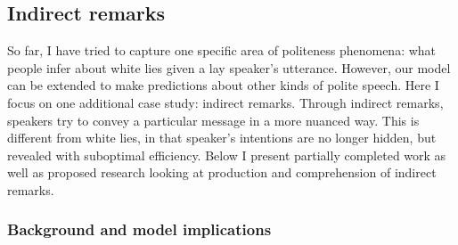 \subsection{Indirect remarks}
\label{sec:other}

So far, I have tried to capture one specific area of politeness phenomena: what people infer about white lies given a lay speaker's utterance. However, our model can be extended to make predictions about other kinds of polite speech. Here I focus on one additional case study: indirect remarks. Through indirect remarks, speakers try to convey a particular message in a more nuanced way. This is different from white lies, in that speaker's intentions are no longer hidden, but revealed with suboptimal efficiency. Below I present partially completed work as well as proposed research looking at production and comprehension of indirect remarks.

\subsubsection{Background and model implications} 

%

